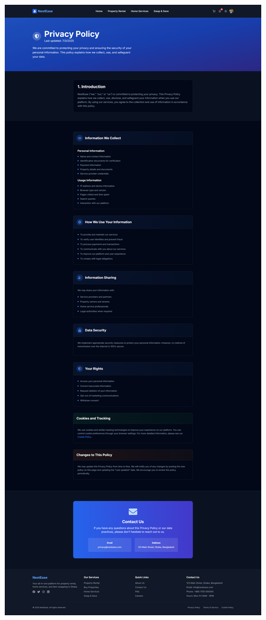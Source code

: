\documentclass[conference]{IEEEtran}
\begin{document}
\begin{center}
\noindent
\begin{minipage}[t]{0.45\textwidth}
\includegraphics[width=\linewidth]{Project Screenshot/Privacy Policy.png}

\end{minipage}
\end{center}
\end{document}
